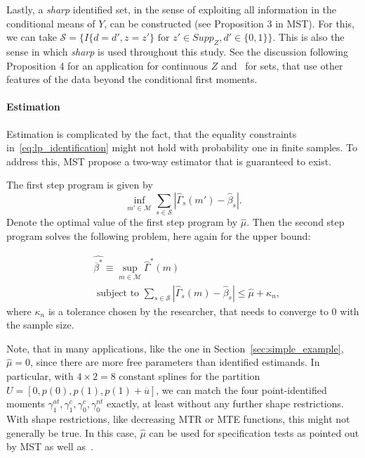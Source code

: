 \documentclass[12pt,a4paper,english]{article} %
\numberwithin{equation}{section}
\theoremstyle{definition}
\theoremstyle{remark}
\theoremstyle{plain}
\begin{document}
Lastly, a \textit{sharp} identified set, in the sense of exploiting all information in the conditional means of $Y$, can be constructed (see Proposition 3 in MST).
For this, we can take $\mathcal{S} = \{I\{d=d', z=z'\} \text{ for } z'\in Supp_Z, d'\in\{0,1\}\}$.
This is also the sense in which \textit{sharp} is used throughout this study.
See the discussion following Proposition 4 for an application for continuous $Z$ and~\cite{marx2024sharp} for sets, that use other features of the data beyond the conditional first moments.

\paragraph{Estimation}
Estimation is complicated by the fact, that the equality constraints in~\ref{eq:lp_identification} might not hold with probability one in finite samples.
To address this, MST propose a two-way estimator that is guaranteed to exist.

The first step program is given by
\begin{equation*}\label{eq:lp_estimation_fs}
  \inf_{m'\in \mathcal{M}} \sum_{s\in\mathcal{S}}|\hat{\Gamma}_s(m') - \hat{\beta}_s|.
\end{equation*}
Denote the optimal value of the first step program by $\hat{\mu}$.
Then the second step program solves the following problem, here again for the upper bound:

\begin{align}\label{eq:lp_estimation}
  & \hat{\overline{\beta}^*} \equiv \sup_{m\in \mathcal{M}}\hat{\Gamma}^*(m) \\
  & \text{ subject to } \sum_{s\in\mathcal{S}}|\hat{\Gamma}_s(m) - \hat{\beta}_s| \leq \hat{\mu} + \kappa_n,
\end{align}
where $\kappa_n$ is a tolerance chosen by the researcher, that needs to converge to $0$ with the sample size.

Note, that in many applications, like the one in Section~\ref{sec:simple_example}, $\hat{\mu} = 0$, since there are more free parameters than identified estimands.
In particular, with $4\times2=8$ constant splines for the partition $U = [0, p(0), p(1), p(1) + \overline{u}]$, we can match the four point-identified moments $\gamma_1^{at}, \gamma_1^c, \gamma_0^c, \gamma_0^{nt}$ exactly, at least without any further shape restrictions.
With shape restrictions, like decreasing MTR or MTE functions, this might not generally be true.
In this case, $\hat{\mu}$ can be used for specification tests as pointed out by MST as well as~\cite{shea2023ivmte}.
\end{document}
